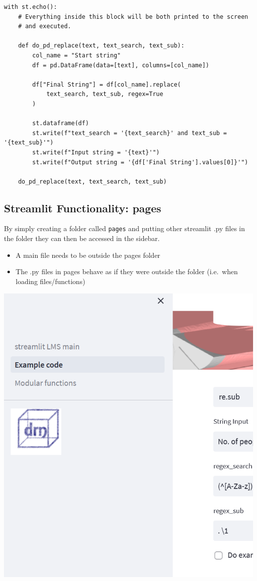 \documentclass[
  letterpaper,
  DIV=11,
  numbers=noendperiod]{scrartcl}
\providecommand{\tightlist}{%
  \setlength{\itemsep}{0pt}\setlength{\parskip}{0pt}}\usepackage{longtable,booktabs,array}
\begin{document}
\begin{verbatim}
with st.echo():
    # Everything inside this block will be both printed to the screen
    # and executed.

    def do_pd_replace(text, text_search, text_sub):
        col_name = "Start string"
        df = pd.DataFrame(data=[text], columns=[col_name])

        df["Final String"] = df[col_name].replace(
            text_search, text_sub, regex=True
        )

        st.dataframe(df)
        st.write(f"text_search = '{text_search}' and text_sub = '{text_sub}'")
        st.write(f"Input string = '{text}'")
        st.write(f"Output string = '{df['Final String'].values[0]}'")

    do_pd_replace(text, text_search, text_sub)
\end{verbatim}

\hypertarget{streamlit-functionality-pages}{%
\subsection{Streamlit Functionality:
pages}\label{streamlit-functionality-pages}}

By simply creating a folder called \texttt{pages} and putting other
streamlit .py files in the folder they can then be accessed in the
sidebar.

\begin{itemize}
\tightlist
\item
  A main file needs to be outside the pages folder
\item
  The .py files in pages behave as if they were outside the folder
  (i.e.~when loading files/functions)
\end{itemize}

\includegraphics{ghtop_images/streamlit_pages.png}
\end{document}
